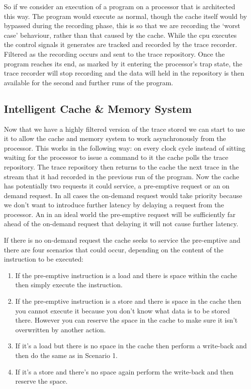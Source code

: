 So if we consider an execution of a program on a processor that is architected this way. The program would execute as normal, though the cache itself would by bypassed during the recording phase, this is so that we are recording the `worst case' behaviour, rather than that caused by the cache. While the \gls{cpu} executes the control signals it generates are tracked and recorded by the trace recorder. Filtered as the recording occurs and sent to the trace repository. Once the program reaches its end, as marked by it entering the processor's trap state, the trace recorder will stop recording and the data will held in the repository is then available for the second and further runs of the program.

\subsection{Intelligent Cache \& Memory System}

Now that we have a highly filtered version of the trace stored we can start to use it to allow the cache and memory system to work asynchronously from the processor. This works in the following way: on every clock cycle instead of sitting waiting for the processor to issue a command to it the cache polls the trace repository. The trace repository then returns to the cache the next trace in the stream that it had recorded in the previous run of the program. Now the cache has potentially two requests it could service, a pre-emptive request or an on demand request. In all cases the on-demand request would take priority because we don't want to introduce further latency by delaying a request from the processor. An in an ideal world the pre-emptive request will be sufficiently far ahead of the on-demand request that delaying it will not cause further latency. 

If there is no on-demand request the cache seeks to service the pre-emptive and there are four scenarios that could occur, depending on the content of the instruction to be executed:

\begin{enumerate}[label=\textbf{Scenario \arabic*:}, align=left, leftmargin=*,labelindent=16pt]
	\item If the pre-emptive instruction is a load and there is space within the cache then simply execute the instruction.
	\item If the pre-emptive instruction is a store and there is space in the cache then you cannot execute it because you don't know what data is to be stored there. However you can reserve the space in the cache to make sure it isn't overwritten by another action.
	\item If it's a load but there is no space in the cache then perform a write-back and then do the same as in Scenario 1.
	\item If it's a store and there's no space again perform the write-back and then reserve the space.
\end{enumerate}

